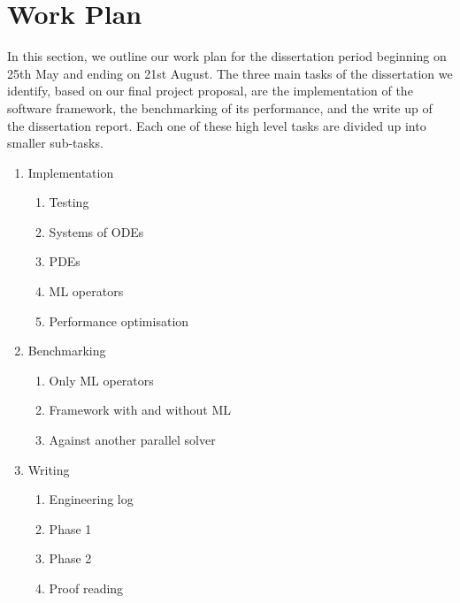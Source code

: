 \documentclass{article}
\begin{document}
\section{Work Plan}

In this section, we outline our work plan for the dissertation period beginning on 25th May and ending on 21st August. The three main tasks of the dissertation we identify, based on our final project proposal, are the implementation of the software framework, the benchmarking of its performance, and the write up of the dissertation report. Each one of these high level tasks are divided up into smaller sub-tasks.

\begin{enumerate}
    \item Implementation
        \begin{enumerate}
        	\item Testing
        	\item Systems of ODEs
        	\item PDEs
        	\item ML operators
        	\item Performance optimisation
        \end{enumerate}
    \item Benchmarking
        \begin{enumerate}
        	\item Only ML operators
        	\item Framework with and without ML
        	\item Against another parallel solver
        \end{enumerate}
    \item Writing
        \begin{enumerate}
            \item Engineering log
            \item Phase 1
            \item Phase 2
        	\item Proof reading
        \end{enumerate}
\end{enumerate}
\end{document}
